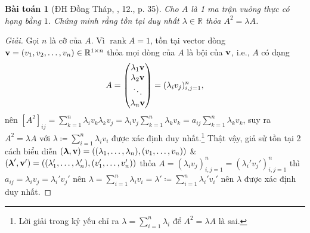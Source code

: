 \documentclass{article}
\newtheorem{baitoan}{Bài toán}
\begin{document}
\begin{baitoan}[ĐH Đồng Tháp, \cite{VMS_VMC2025}, 12., p. 35]
	Cho $A$ là 1 ma trận vuông thực có hạng bằng $1$. Chứng minh rằng tồn tại duy nhất $\lambda\in\mathbb{R}$ thỏa $A^2 = \lambda A$.
\end{baitoan}

\begin{proof}[Giải]
	Gọi $n$ là cỡ của $A$. Vì $\operatorname{rank}A = 1$, tồn tại vector dòng ${\bf v} = (v_1,v_2,\ldots,v_n)\in\mathbb{R}^{1\times n}$ thỏa mọi dòng của $A$ là bội của ${\bf v}$, i.e., $A$ có dạng
	\begin{equation*}
		A = \begin{pmatrix}
			\lambda_1{\bf v}\\\lambda_2{\bf v}\\\ddots\\\lambda_n{\bf v}
		\end{pmatrix} = (\lambda_iv_j)_{i,j=1}^n,
	\end{equation*}
	nên $[A^2]_{ij} = \sum_{k=1}^n \lambda_iv_k\lambda_kv_j = \lambda_iv_j\sum_{k=1}^n \lambda_kv_k = a_{ij}\sum_{k=1}^n \lambda_kv_k$, suy ra $A^2 = \lambda A$ với $\lambda\coloneqq\sum_{i=1}^n \lambda_iv_i$ được xác định duy nhất.\footnote{Lời giải trong kỷ yếu chỉ ra $\lambda = \sum_{i=1}^n \lambda_i$ để $A^2 = \lambda A$ là sai.} Thật vậy, giả sử tồn tại 2 cách biểu diễn $(\boldsymbol{\lambda},{\bf v}) = ((\lambda_1,\ldots,\lambda_n),(v_1,\ldots,v_n))$ \& $(\boldsymbol{\lambda}',{\bf v}') = ((\lambda_1',\ldots,\lambda_n'),(v_1',\ldots,v_n'))$ thỏa $A = (\lambda_iv_j)_{i,j=1}^n = (\lambda_i'v_j')_{i,j=1}^n$ thì $a_{ij} = \lambda_iv_j = \lambda_i'v_j'$ nên $\lambda = \sum_{i=1}^n \lambda_iv_i = \lambda'\coloneqq\sum_{i=1}^n \lambda_i'v_i'$ nên $\lambda$ được xác định duy nhất.
\end{proof}
\end{document}
